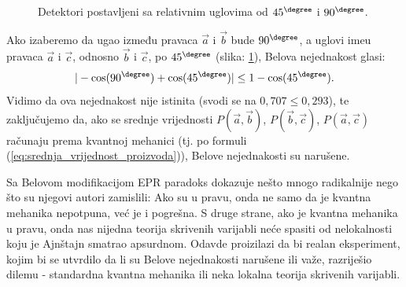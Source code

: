 \begin{figure}[h]
    \centering
    \caption{Detektori postavljeni sa relativnim uglovima od $45^\degree$ i $90^\degree$.}
    \label{fig:detectors_with_chosen_angles}
\end{figure}

Ako izaberemo da ugao između pravaca $\vec{a}$ i $\vec{b}$ bude $90^\degree$, a uglovi ime\dj u pravaca $\vec{a}$ i $\vec{c}$, odnosno $\vec{b}$ i $\vec{c}$, po $45^\degree$ (slika: \ref{fig:detectors_with_chosen_angles}), Belova nejednakost glasi:
\begin{equation}
    | - \mathrm{cos}(90^\degree) + \mathrm{cos}(45^\degree)|\le 1 - \mathrm{cos}(45^\degree).
\end{equation}
Vidimo da ova nejednakost nije istinita (svodi se na $0,707 \le 0,293$), te zaključujemo da, ako se srednje vrijednosti $P(\vec{a},\vec{b})$, $P(\vec{b},\vec{c})$, $P(\vec{a},\vec{c})$ računaju prema kvantnoj mehanici (tj. po formuli (\ref{eq:srednja_vrijednost_proizvoda})), Belove nejednakosti su narušene.

Sa Belovom modifikacijom EPR paradoks dokazuje nešto mnogo radikalnije nego što su njegovi autori zamislili:
Ako su u pravu, onda ne samo da je kvantna mehanika nepotpuna, već je i pogrešna.
S druge strane, ako je kvantna mehanika u pravu, onda nas nijedna teorija skrivenih varijabli neće spasiti od nelokalnosti koju je Ajnštajn smatrao apsurdnom.
Odavde proizilazi da bi realan eksperiment, kojim bi se utvrdilo da li su Belove nejednakosti narušene ili važe, razriješio dilemu - standardna kvantna mehanika ili neka lokalna teorija skrivenih varijabli.
